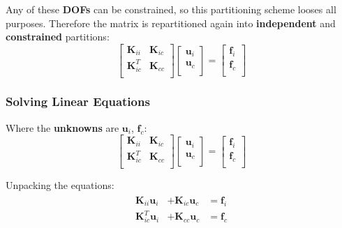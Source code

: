 \documentclass[10pt,b5paper,titlepage]{book}
\newcommand{\m}{\mathbf}
\newenvironment{eqarray}
{
    \begin{eqnarray}
        \begin{aligned}
}
{
        \end{aligned}
    \end{eqnarray}
}
\begin{document}
Any of these \textbf{DOFs} can be constrained, so this partitioning scheme looses
all purposes. Therefore the matrix is repartitioned again into
\textbf{independent} and \textbf{constrained} partitions:
\begin{equation}
    \begin{bmatrix}
        \m{K}_{ii} & \m{K}_{ic} \\
        \m{K}_{ic}^T & \m{K}_{cc} \\
    \end{bmatrix}
    \begin{bmatrix}
        \m{u}_i \\
        \m{u}_c \\
    \end{bmatrix}
    = \begin{bmatrix}
        \m{f}_{i} \\
        \m{f}_c \\
    \end{bmatrix}
\end{equation}


\subsubsection{Solving Linear Equations}

Where the \textbf{unknowns} are $ \m{u}_i $, $ \m{f}_c $:
\begin{equation}
    \begin{bmatrix}
        \m{K}_{ii} & \m{K}_{ic} \\
        \m{K}_{ic}^T & \m{K}_{cc} \\
    \end{bmatrix}
    \begin{bmatrix}
        \boxed{\m{u}_i} \\
        \m{u}_c \\
    \end{bmatrix}
    = \begin{bmatrix}
        \m{f}_i \\
        \boxed{\m{f}_c} \\
    \end{bmatrix}
\end{equation}

Unpacking the equations:
\begin{eqarray}
    \m{K}_{ii} \boxed{\m{u}_i} &+ \m{K}_{ic} \m{u}_c &= \m{f}_i \\
    \m{K}_{ic}^T \boxed{\m{u}_i} &+ \m{K}_{cc} \m{u}_c &= \boxed{\m{f}_c} \\
\end{eqarray}
\end{document}
